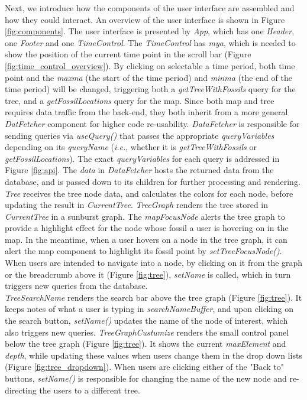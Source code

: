 \documentclass[11pt, a4paper,oneside,chapterprefix=false]{scrbook}
\begin{document}
Next, we introduce how the components of the user interface are assembled and how they could interact. An overview of the user interface is shown in Figure \ref{fig:components}. The user interface is presented by \emph{App}, which has one \emph{Header}, one \emph{Footer} and one \emph{TimeControl}. The \emph{TimeControl} has \emph{mya}, which is needed to show the position of the current time point in the scroll bar (Figure \ref{fig:time_control_overview}). By clicking on selectable a time period, both time point and the \emph{maxma} (the start of the time period) and \emph{minma} (the end of the time period) will be changed, triggering both a \emph{getTreeWithFossils} query for the tree, and a \emph{getFossilLocations} query for the map. Since both map and tree requires data traffic from the back-end, they both inherit from a more general \emph{DatFetcher} component for higher code re-usability. \emph{DataFetcher} is responsible for sending queries via \emph{useQuery()} that passes the appropriate \emph{queryVariables} depending on its \emph{queryName} (\emph{i.e.}, whether it is \emph{getTreeWithFossils} or \emph{getFossilLocations}). The exact \emph{queryVariables} for each query is addressed in Figure \ref{fig:api}. The \emph{data} in \emph{DataFetcher} hosts the returned data from the database, and is passed down to its children for further processing and rendering. \\

\emph{Tree} receives the tree node data, and calculates the colors for each node, before updating the result in \emph{CurrentTree}. \emph{TreeGraph} renders the tree stored in \emph{CurrentTree} in a sunburst graph. The \emph{mapFocusNode} alerts the tree graph to provide a highlight effect for the node whose fossil a user is hovering on in the map. In the meantime, when a user hovers on a node in the tree graph, it can alert the map component to highlight its fossil point by \emph{setTreeFocusNode()}. When users are intended to navigate into a node, by clicking on it from the graph or the breadcrumb above it (Figure \ref{fig:tree}), \emph{setName} is called, which in turn triggers new queries from the database. \\

\emph{TreeSearchName} renders the search bar above the tree graph (Figure \ref{fig:tree}). It keeps notes of what a user is typing in \emph{searchNameBuffer}, and upon clicking on the search button, \emph{setName()} updates the name of the node of interest, which also triggers new queries. \emph{TreeGraphCustumize} renders the small control panel below the tree graph (Figure \ref{fig:tree}). It shows the current \emph{maxElement} and \emph{depth}, while updating these values when users change them in the drop down lists (Figure \ref{fig:tree_dropdown}). When users are clicking either of the "Back to" buttons, \emph{setName()} is responsible for changing the name of the new node and re-directing the users to a different tree. \\
\end{document}
